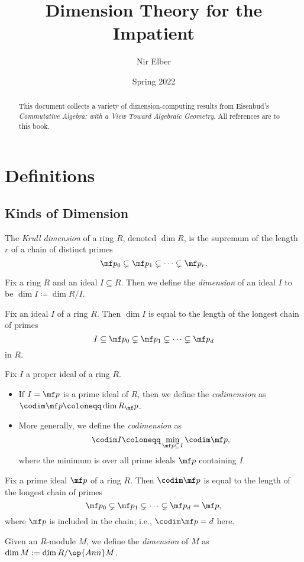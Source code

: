 \documentclass{article}
\title{Dimension Theory for the Impatient}
\author{Nir Elber}
\date{Spring 2022}
\begin{document}
\maketitle

\begin{abstract}
	\noindent This document collects a variety of dimension-computing results from Eisenbud's \textit{Commutative Algebra: with a View Toward Algebraic Geometry}. All references are to this book.
\end{abstract}

\setcounter{secnumdepth}{4}
\setcounter{tocdepth}{4}
\tableofcontents

\newpage

\section{Definitions}

\subsection{Kinds of Dimension}
\begin{defi*}[Dimension] \label{def:krulldim}
	The \textit{Krull dimension} of a ring $R$, denoted $\dim R$, is the supremum of the length $r$ of a chain of distinct primes
	\[\mf p_0\subsetneq\mf p_1\subsetneq\cdots\subsetneq\mf p_r.\]
\end{defi*}
\begin{definition*}
	Fix a ring $R$ and an ideal $I\subseteq R$. Then we define the \textit{dimension} of an ideal $I$ to be $\dim I\coloneqq\dim R/I$.
\end{definition*}
\begin{lemma*} \label{lem:dimisascend}
	Fix an ideal $I$ of a ring $R$. Then $\dim I$ is equal to the length of the longest chain of primes
	\[I\subseteq\mf p_0\subsetneq\mf p_1\subsetneq\cdots\subsetneq\mf p_d\]
	in $R$.
\end{lemma*}
\begin{definition*}[Codimension]
	Fix $I$ a proper ideal of a ring $R$.
	\begin{itemize}
		\item If $I=\mf p$ is a prime ideal of $R$, then we define the \textit{codimension} as $\codim\mf p\coloneqq\dim R_\mf p$.
		\item More generally, we define the \textit{codimension} as
		\[\codim I\coloneqq\min_{\mf p\subseteq I}\codim\mf p,\]
		where the minimum is over all prime ideals $\mf p$ containing $I$.
	\end{itemize}
\end{definition*}
\begin{lemma*} \label{lem:codimisdescend}
	Fix a prime ideal $\mf p$ of a ring $R$. Then $\codim\mf p$ is equal to the length of the longest chain of primes
	\[\mf p_0\subsetneq\mf p_1\subsetneq\cdots\subsetneq\mf p_d=\mf p,\]
	where $\mf p$ is included in the chain; i.e., $\codim\mf p=d$ here.
\end{lemma*}
\begin{definition*}
	Given an $R$-module $M$, we define the \textit{dimension} of $M$ as $\dim M:=\dim R/\op{Ann}M$.
\end{definition*}
\end{document}

